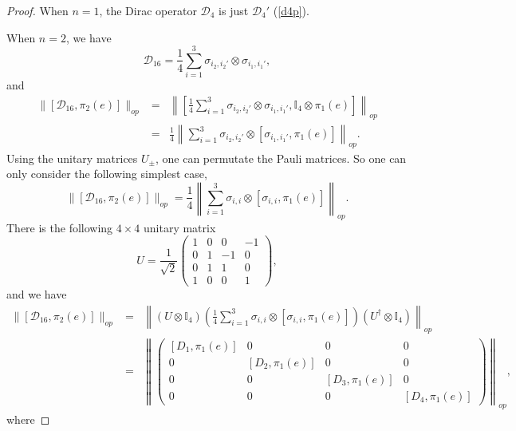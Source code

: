 \documentclass[a4paper,12pt]{article}
\begin{document}
\begin{proof}
	When $n = 1$, the Dirac operator $\mathcal{D}_{4}$ is just $\mathcal{D}_4'$ (\ref{d4p}).

When $n = 2$, we have
\begin{equation}
	\mathcal{D}_{16} = \frac{1}{4}  \sum_{i = 1}^3 \sigma_{i_2, i_2'} \otimes
	\sigma_{i_1, i_1'},
\end{equation}
and
\begin{eqnarray}
	\|[\mathcal{D}_{16}, \pi_2 (e)]\|_{op} & = & \left\| \left[ \frac{1}{4} 
	\sum_{i = 1}^3 \sigma_{i_2, i_2'} \otimes \sigma_{i_1, i_1'}, \mathbb{I}_4
	\otimes \pi_1 (e) \right] \right\|_{op} \nonumber\\
	& = & \frac{1}{4} \left\| \sum_{i = 1}^3 \sigma_{i_2, i_2'} \otimes
	[\sigma_{i_1, i_1'}, \pi_1 (e)] \right\|_{op} . 
\end{eqnarray}
Using the unitary matrices $U_{\pm}$, one can permutate the Pauli matrices. So
one can only consider the following simplest case,
\begin{equation}
	\|[\mathcal{D}_{16}, \pi_2 (e)]\|_{op} = \frac{1}{4} \left\| \sum_{i = 1}^3
	\sigma_{i, i} \otimes [\sigma_{i, i}, \pi_1 (e)] \right\|_{op} .
\end{equation}
There is the following $4 \times 4$ unitary matrix
\begin{equation}
	U = \frac{1}{\sqrt{2}} \left( \begin{array}{cccc}
		1 & 0 & 0 & - 1\\
		0 & 1 & - 1 & 0\\
		0 & 1 & 1 & 0\\
		1 & 0 & 0 & 1
	\end{array} \right),
\end{equation}
and we have
\begin{eqnarray}
	\|[\mathcal{D}_{16}, \pi_2 (e)]\|_{op} 
	& = & \left\| (U \otimes \mathbb{I}_4) \left( \frac{1}{4}  \sum_{i = 1}^3
	\sigma_{i, i} \otimes [\sigma_{i, i}, \pi_1 (e)] \right) (U^{\dag} \otimes
	\mathbb{I}_4) \right\|_{op} \\
	& = & \left\| \left( \begin{array}{cccc}
		{}[D_1, \pi_1 (e)] & 0 & 0 & 0\\
		0 & [D_2, \pi_1 (e)] & 0 & 0\\
		0 & 0 & [D_3, \pi_1 (e)] & 0\\
		0 & 0 & 0 & [D_4, \pi_1 (e)]
	\end{array} \right) \right\|_{op}, \nonumber
\end{eqnarray}
where

\end{proof}
\end{document}
